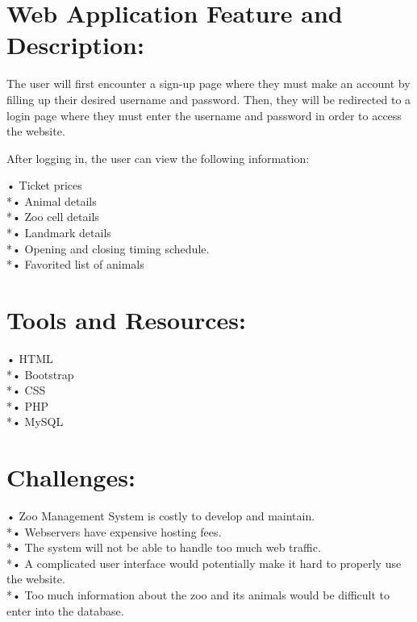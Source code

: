 \documentclass{article}
\begin{document}
\vspace{8mm}

\section{Web Application Feature and Description:}
{\flushleft

The user will first encounter a sign-up page where they must make an account by filling up their desired username and password. Then, they will be redirected to a login page where they must enter the username and password in order to access the website.

\vspace{4mm}After logging in, the user can view the following information:\vspace{4mm}

•	Ticket prices
\\*•	Animal details
\\*•	Zoo cell details
\\*•	Landmark details
\\*•	Opening and closing timing schedule.
\\*•	Favorited list of animals




}

\newpage
\section{Tools and Resources:}
{\flushleft

•	HTML
\\*•	Bootstrap
\\*•	CSS
\\*•	PHP
\\*•	MySQL




}

\vspace{20mm}

\section{Challenges:}
{\flushleft

•	Zoo Management System is costly to develop and maintain.
\\*•	Webservers have expensive hosting fees.
\\*•	The system will not be able to handle too much web traffic.
\\*•	A complicated user interface would potentially make it hard to properly use the website.
\\*•	Too much information about the zoo and its animals would be difficult to enter into the database.




}
\end{document}
